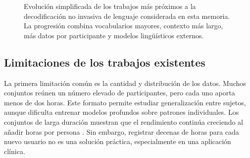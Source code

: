 \begin{figure}[htbp]
    \centering
    \caption{Evolución simplificada de los trabajos más próximos a la decodificación no invasiva de lenguaje considerada en esta memoria. La progresión combina vocabularios mayores, contexto más largo, más datos por participante y modelos lingüísticos externos.}
    \label{fig:sota_timeline}
\end{figure}


\subsection{Limitaciones de los trabajos existentes}

La primera limitación común es la cantidad y distribución de los datos. Muchos conjuntos reúnen un número elevado de participantes, pero cada uno aporta menos de dos horas. Este formato permite estudiar generalización entre sujetos, aunque dificulta entrenar modelos profundos sobre patrones individuales. Los conjuntos de larga duración muestran que el rendimiento continúa creciendo al añadir horas por persona \cite{sato2024scaling,ozdogan2025libribrain,dascoli2024words}. Sin embargo, registrar decenas de horas para cada nuevo usuario no es una solución práctica, especialmente en una aplicación clínica.

